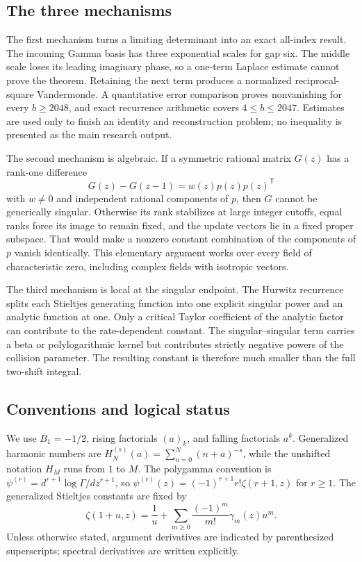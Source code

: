 \subsection{The three mechanisms}

The first mechanism turns a limiting determinant into an exact
all-index result. The incoming Gamma basis has three exponential
scales for gap six. The middle scale loses its leading imaginary
phase, so a one-term Laplace estimate cannot prove the theorem.
Retaining the next term produces a normalized reciprocal-square
Vandermonde. A quantitative error comparison proves nonvanishing
for every $b\ge2048$, and exact recurrence arithmetic covers
$4\le b\le2047$. Estimates are used only to finish an identity and
reconstruction problem; no inequality is presented as the main
research output.

The second mechanism is algebraic. If a symmetric rational matrix
$G(z)$ has a rank-one difference
\[
 G(z)-G(z-1)=w(z)p(z)p(z)^{\mathsf T}
\]
with $w\ne0$ and independent rational components of $p$, then
$G$ cannot be generically singular. Otherwise its rank stabilizes
at large integer cutoffs, equal ranks force its image to remain
fixed, and the update vectors lie in a fixed proper subspace.
That would make a nonzero constant combination of the components
of $p$ vanish identically. This elementary argument works over
every field of characteristic zero, including complex fields with
isotropic vectors.

The third mechanism is local at the singular endpoint. The
Hurwitz recurrence splits each Stieltjes generating function into
one explicit singular power and an analytic function at one.
Only a critical Taylor coefficient of the analytic factor can
contribute to the rate-dependent constant. The singular--singular
term carries a beta or polylogarithmic kernel but contributes
strictly negative powers of the collision parameter. The resulting
constant is therefore much smaller than the full two-shift
integral.

\subsection{Conventions and logical status}

We use $B_1=-1/2$, rising factorials $(a)_k$, and falling
factorials $a^{\underline k}$. Generalized harmonic numbers are
$H_N^{(s)}(a)=\sum_{n=0}^N(n+a)^{-s}$, while the unshifted
notation $H_M$ runs from $1$ to $M$. The polygamma convention is
$\psi^{(r)}=d^{r+1}\log\Gamma/dz^{r+1}$, so
$\psi^{(r)}(z)=(-1)^{r+1}r!\zeta(r+1,z)$ for $r\ge1$.
The generalized Stieltjes constants are fixed by
\[
 \zeta(1+u,z)=\frac1u+
       \sum_{m\ge0}\frac{(-1)^m}{m!}\gamma_m(z)u^m.
\]
Unless otherwise stated, argument derivatives are indicated by
parenthesized superscripts; spectral derivatives are written
explicitly.

